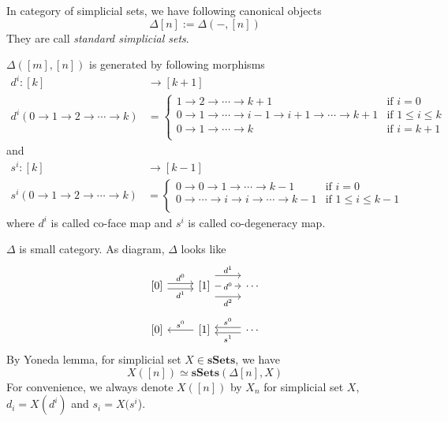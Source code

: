 \documentclass[b5paper,11pt]{article}
\begin{document}
	In category of simplicial sets, we have following canonical objects
	\[
	\Delta[n] := \Delta(-,[n])
	\]
	They are call \emph{standard simplicial sets}.
	\begin{secprop}
		$\Delta([m],[n])$ is generated by following morphisms
		\[
		\begin{aligned}
			d^i \colon [k] &\to [k+1]\\
			d^i(0 \to 1 \to 2 \to \cdots \to k)&=\begin{cases}
			1\to 2 \to \cdots \to k+1& \text{if } i =0\\
			0 \to 1 \to \cdots \to i-1 \to i+1 \to \cdots \to k+1& \text{if } 1\leq i \leq k\\
			0 \to 1 \to \cdots \to k& \text{if } i =k+1\\
			\end{cases}
		\end{aligned} 
		\]
		and
		\[
		\begin{aligned}
		s^i \colon [k] &\to [k-1]\\
		s^i(0 \to 1 \to 2 \to \cdots \to k)&=\begin{cases}
		0\to 0 \to 1 \to \cdots \to k-1& \text{if } i =0\\
		0 \to \cdots \to i \to i  \to \cdots \to k-1& \text{if } 1\leq i \leq k-1\\
		\end{cases}
		\end{aligned} 
		\]
		where $d^i$ is called co-face map and $s^i$ is called co-degeneracy map.
	\end{secprop}
$\Delta$ is small category. As diagram, $\Delta$ looks like
\[
\begin{tikzcd} 
 {[0]} \arrow[r, shift left,"d^0"] \arrow[r, shift right,"d^1"'] & {[1]} \arrow[r,"d^0" description] \arrow[r, shift left=4,"d^1"] \arrow[r, shift right=4,"d^2"'] & \cdots 
\end{tikzcd}
\]
\[
\begin{tikzcd} 
{[0]} \arrow[r,"s^0",leftarrow] & {[1]} \arrow[r,shift left,"s^0",leftarrow] \arrow[r, shift right,"s^1"',leftarrow]  & \cdots 
\end{tikzcd}
\]
By Yoneda lemma, for simplicial set $X \in \mathbf{sSets}$, we have 
\[
X([n])\simeq \mathbf{sSets}(\Delta[n], X)
\]
For convenience, we always denote $X([n])$ by $X_n$ for simplicial set $X$, $d_i = X(d^i)$ and $s_i= X(s^i$). 
\end{document}
